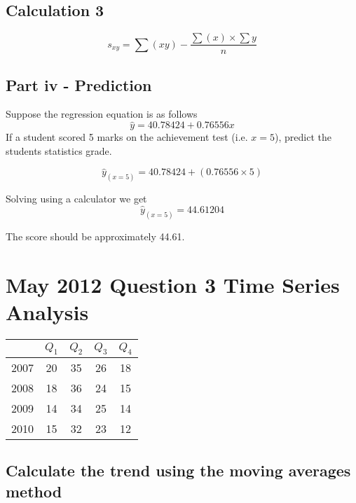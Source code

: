 \documentclass[12pts]{article}
\begin{document}
\subsection*{Calculation 3}
\[ s_{xy}  = \sum(xy) - \frac{\sum(x)\times \sum{y}}{n} \]


\subsection*{Part iv - Prediction}
Suppose the regression equation is as follows
\[ \hat{y} = 40.78424 + 0.76556 x \]
If a student scored 5 marks on the achievement test (i.e. $x=5$), predict the students statistics grade.

\[ \hat{y}_{(x=5)} = 40.78424 + (0.76556 \times 5) \]

Solving using a calculator we get
\[ \hat{y}_{(x=5)} = 44.61204 \]

The score should be approximately 44.61.

\newpage
\section*{May 2012 Question 3 Time Series Analysis}
\begin{center}
\begin{tabular}{|c|c|c|c|c|}
\hline  & $Q_1$ & $Q_2$ & $Q_3$ & $Q_4$ \\
\hline 2007 & 20 & 35 & 26 & 18 \\  
\hline 2008 & 18 & 36 & 24& 15 \\ 
\hline 2009 & 14 & 34 & 25 & 14 \\ 
\hline 2010 & 15 & 32 & 23 & 12 \\ 
\hline 
\end{tabular} 
\end{center}
\subsection*{Calculate the trend using the moving averages method}
\end{document}

